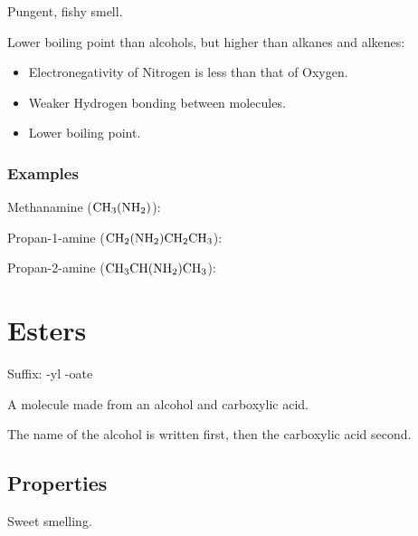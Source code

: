 \documentclass[a4paper,11pt]{article}
\begin{document}
Pungent, fishy smell.

Lower boiling point than alcohols, but higher than alkanes and alkenes:

\begin{itemize}
\item Electronegativity of Nitrogen is less than that of Oxygen.
\item Weaker Hydrogen bonding between molecules.
\item Lower boiling point.
\end{itemize}


\subsubsection{Examples}

Methanamine ($\ce{CH3(NH2)}$):

\begin{center}
\end{center}

Propan-1-amine ($\ce{CH2(NH2)CH2CH3}$):

\begin{center}
\end{center}

Propan-2-amine ($\ce{CH3CH(NH2)CH3}$):

\begin{center}
\end{center}




\section{Esters}

Suffix: -yl -oate

A molecule made from an alcohol and carboxylic acid.

The name of the alcohol is written first, then the carboxylic acid second.


\subsection{Properties}

Sweet smelling.
\end{document}
